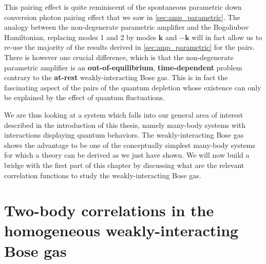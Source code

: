 
This pairing effect is quite reminiscent of the spontaneous parametric down conversion photon pairing effect that we saw in \ref{sec:amp_parametric}. The analogy between the non-degenerate parametric amplifier and the Bogoliubov Hamiltonian, replacing modes 1 and 2 by modes $\bm{k}$ and $-\bm{k}$ will in fact allow us to re-use the majority of the results derived in \ref{sec:amp_parametric} for the \kmk pairs. There is however one crucial difference, which is that the non-degenerate parametric amplifier is an \textbf{out-of-equilibrium}, \textbf{time-dependent} problem contrary to the \textbf{at-rest} weakly-interacting Bose gas. This is in fact the fascinating aspect of the \kmk pairs of the quantum depletion whose existence can only be explained by the effect of quantum fluctuations.



We are thus looking at a system which falls into our general area of interest described in the introduction of this thesis, namely many-body systems with interactions displaying quantum behaviors. The weakly-interacting Bose gas shows the advantage to be one of the conceptually simplest many-body systems for which a theory can be derived as we just have shown. We will now build a bridge with the first part of this chapter by discussing what are the relevant correlation functions to study the weakly-interacting Bose gas.


\section{Two-body correlations in the homogeneous weakly-interacting Bose gas}

